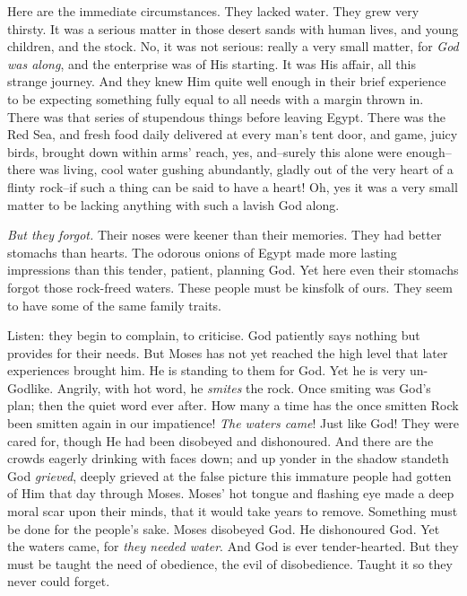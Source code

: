 Here are the immediate circumstances. They lacked water. They grew very
thirsty. It was a serious matter in those desert sands with human lives,
and young children, and the stock. No, it was not serious: really a very
small matter, for \textit{God was along}, and the enterprise was of His starting.
It was His affair, all this strange journey. And they knew Him quite well
enough in their brief experience to be expecting something fully equal to
all needs with a margin thrown in. There was that series of stupendous
things before leaving Egypt. There was the Red Sea, and fresh food daily
delivered at every man's tent door, and game, juicy birds, brought down
within arms' reach, yes, and--surely this alone were enough--there was
living, cool water gushing abundantly, gladly out of the very heart of a
flinty rock--if such a thing can be said to have a heart! Oh, yes it was a
very small matter to be lacking anything with such a lavish God along.

\textit{But they forgot.} Their noses were keener than their memories. They had
better stomachs than hearts. The odorous onions of Egypt made more
lasting impressions than this tender, patient, planning God. Yet here
even their stomachs forgot those rock-freed waters. These people must be
kinsfolk of ours. They seem to have some of the same family traits.

Listen: they begin to complain, to criticise. God patiently says nothing
but provides for their needs. But Moses has not yet reached the high level
that later experiences brought him. He is standing to them for God. Yet he
is very un-Godlike. Angrily, with hot word, he \textit{smites} the rock. Once
smiting was God's plan; then the quiet word ever after. How many a time
has the once smitten Rock been smitten again in our impatience! \textit{The
waters came}! Just like God! They were cared for, though He had been
disobeyed and dishonoured. And there are the crowds eagerly drinking with
faces down; and up yonder in the shadow standeth God \textit{grieved}, deeply
grieved at the false picture this immature people had gotten of Him that
day through Moses. Moses' hot tongue and flashing eye made a deep moral
scar upon their minds, that it would take years to remove. Something must
be done for the people's sake. Moses disobeyed God. He dishonoured God.
Yet the waters came, for \textit{they needed water}. And God is ever
tender-hearted. But they must be taught the need of obedience, the evil of
disobedience. Taught it so they never could forget.

